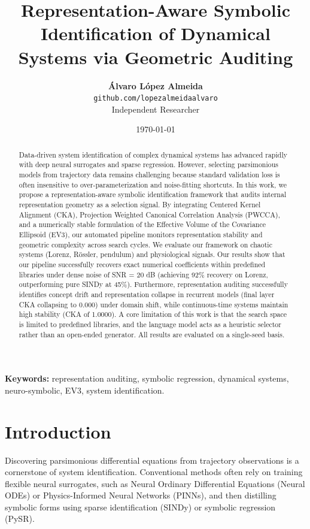 \documentclass[twocolumn]{article}
\title{\textbf{Representation-Aware Symbolic Identification of Dynamical Systems via Geometric Auditing}}
\author{
  \textbf{Álvaro López Almeida} \\
  \small \texttt{github.com/lopezalmeidaalvaro} \\
  \small Independent Researcher
}
\date{\today}
\begin{document}
\maketitle

\begin{abstract}
Data-driven system identification of complex dynamical systems has advanced rapidly with deep neural surrogates and sparse regression. However, selecting parsimonious models from trajectory data remains challenging because standard validation loss is often insensitive to over-parameterization and noise-fitting shortcuts. In this work, we propose a representation-aware symbolic identification framework that audits internal representation geometry as a selection signal. By integrating Centered Kernel Alignment (CKA), Projection Weighted Canonical Correlation Analysis (PWCCA), and a numerically stable formulation of the Effective Volume of the Covariance Ellipsoid (EV3), our automated pipeline monitors representation stability and geometric complexity across search cycles. We evaluate our framework on chaotic systems (Lorenz, R\"ossler, pendulum) and physiological signals. Our results show that our pipeline successfully recovers exact numerical coefficients within predefined libraries under dense noise of SNR = 20 dB (achieving 92\% recovery on Lorenz, outperforming pure SINDy at 45\%). Furthermore, representation auditing successfully identifies concept drift and representation collapse in recurrent models (final layer CKA collapsing to 0.000) under domain shift, while continuous-time systems maintain high stability (CKA of 1.0000). A core limitation of this work is that the search space is limited to predefined libraries, and the language model acts as a heuristic selector rather than an open-ended generator. All results are evaluated on a single-seed basis.
\end{abstract}

\textbf{Keywords:} representation auditing, symbolic regression, dynamical systems, neuro-symbolic, EV3, system identification.

\section{Introduction}
\label{sec:intro}
Discovering parsimonious differential equations from trajectory observations is a cornerstone of system identification. Conventional methods often rely on training flexible neural surrogates, such as Neural Ordinary Differential Equations (Neural ODEs) or Physics-Informed Neural Networks (PINNs), and then distilling symbolic forms using sparse identification (SINDy) or symbolic regression (PySR). 
\end{document}
